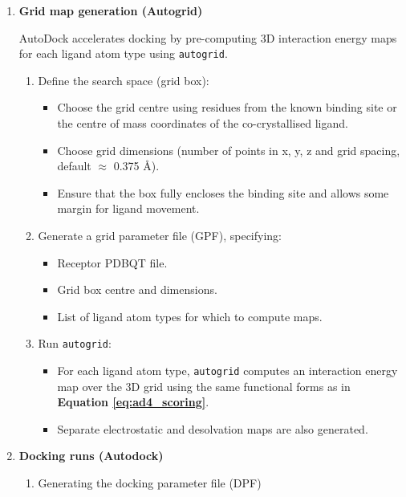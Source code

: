 \documentclass[12pt]{article}
\begin{document}
\begin{enumerate}
  \item \textbf{Grid map generation (Autogrid)}

AutoDock accelerates docking by pre-computing 3D interaction energy maps for each ligand atom type using \verb|autogrid|\cite{CH7_Morris2009}.

\begin{enumerate}
  \item Define the search space (grid box):
  \begin{itemize}
    \item Choose the grid centre using residues from the known binding site or the centre of mass coordinates of the co-crystallised ligand.
    \item Choose grid dimensions (number of points in x, y, z and grid spacing, default $\approx$ 0.375 \r{A}).
    \item Ensure that the box fully encloses the binding site and allows some margin for ligand movement.
  \end{itemize}
  \item Generate a grid parameter file (GPF), specifying:
  \begin{itemize}
    \item Receptor PDBQT file.
    \item Grid box centre and dimensions.
    \item List of ligand atom types for which to compute maps.
  \end{itemize}
  \item Run \verb|autogrid|:
  \begin{itemize}
    \item For each ligand atom type, \verb|autogrid| computes an interaction energy map over the 3D grid using the same functional forms as in \textbf{Equation \ref{eq:ad4_scoring}}.
    \item Separate electrostatic and desolvation maps are also generated.
  \end{itemize}
\end{enumerate}

  \item \textbf{Docking runs (Autodock)}
  \begin{enumerate}
\item Generating the docking parameter file (DPF)


\end{enumerate}
\end{enumerate}
\end{document}

